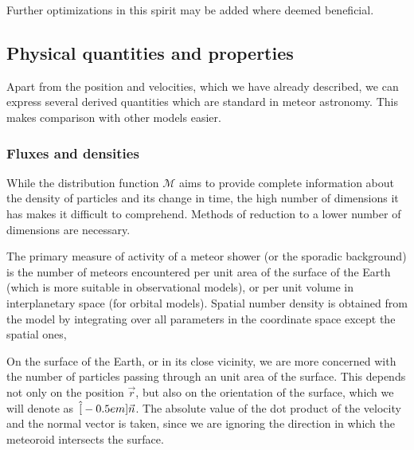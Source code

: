             Further optimizations in this spirit may be added where deemed beneficial.

    \subsection{Physical quantities and properties} \label{mop}
        Apart from the position and velocities, which we have already described, we can express
        several derived quantities which are standard in meteor astronomy. This makes comparison
        with other models easier.

        \subsubsection{Fluxes and densities} \label{mopf}
            While the distribution function $\mathcal{M}$ aims to provide complete information
            about the density of particles and its change in time,
            the high number of dimensions it has makes it difficult to comprehend.
            Methods of reduction to a lower number of dimensions are necessary.

            The primary measure of activity of a meteor shower (or the sporadic background) is the number
            of meteors encountered per unit area of the surface of the Earth (which is more suitable
            in observational models), or per unit volume in interplanetary space (for orbital models).
            Spatial number density is obtained from the model by integrating over all parameters
            in the coordinate space except the spatial ones,

            On the surface of the Earth, or in its close vicinity, we are more concerned with
            the number of particles passing through an unit area of the surface. This depends not only
            on the position $\vec{r}$, but also on the orientation of the surface, which we will denote as~$\Hat[-0.5em]{\vec{n}}$.
            The absolute value of the dot product of the velocity and the normal vector is taken,
            since we are ignoring the direction in which the meteoroid intersects the surface.

